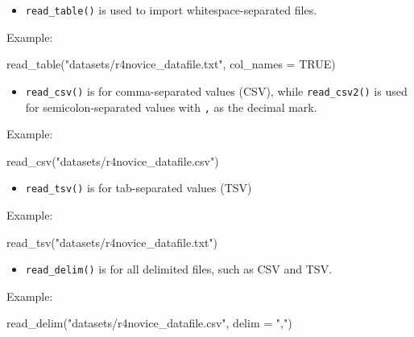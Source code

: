\documentclass[
  letterpaper,
  DIV=11,
  numbers=noendperiod]{scrreprt}
\newenvironment{Shaded}{}{}
\newcommand{\AttributeTok}[1]{\textcolor[rgb]{0.84,0.23,0.29}{#1}}
\newcommand{\ConstantTok}[1]{\textcolor[rgb]{0.00,0.36,0.77}{#1}}
\newcommand{\FunctionTok}[1]{\textcolor[rgb]{0.44,0.26,0.76}{#1}}
\newcommand{\NormalTok}[1]{\textcolor[rgb]{0.14,0.16,0.18}{#1}}
\newcommand{\StringTok}[1]{\textcolor[rgb]{0.01,0.18,0.38}{#1}}
\providecommand{\tightlist}{%
  \setlength{\itemsep}{0pt}\setlength{\parskip}{0pt}}\usepackage{longtable,booktabs,array}
\begin{document}
\begin{itemize}
\tightlist
\item
  \texttt{read\_table()} is used to import whitespace-separated files.
\end{itemize}

Example:

\begin{Shaded}
\begin{Highlighting}[]
\FunctionTok{read\_table}\NormalTok{(}\StringTok{"datasets/r4novice\_datafile.txt"}\NormalTok{, }\AttributeTok{col\_names =} \ConstantTok{TRUE}\NormalTok{)}
\end{Highlighting}
\end{Shaded}

\begin{itemize}
\tightlist
\item
  \texttt{read\_csv()} is for comma-separated values (CSV), while
  \texttt{read\_csv2()} is used for semicolon-separated values with
  \texttt{,} as the decimal mark.
\end{itemize}

Example:

\begin{Shaded}
\begin{Highlighting}[]
\FunctionTok{read\_csv}\NormalTok{(}\StringTok{"datasets/r4novice\_datafile.csv"}\NormalTok{)}
\end{Highlighting}
\end{Shaded}

\begin{itemize}
\tightlist
\item
  \texttt{read\_tsv()} is for tab-separated values (TSV)
\end{itemize}

Example:

\begin{Shaded}
\begin{Highlighting}[]
\FunctionTok{read\_tsv}\NormalTok{(}\StringTok{"datasets/r4novice\_datafile.txt"}\NormalTok{)}
\end{Highlighting}
\end{Shaded}

\begin{itemize}
\tightlist
\item
  \texttt{read\_delim()} is for all delimited files, such as CSV and
  TSV.
\end{itemize}

Example:

\begin{Shaded}
\begin{Highlighting}[]
\FunctionTok{read\_delim}\NormalTok{(}\StringTok{"datasets/r4novice\_datafile.csv"}\NormalTok{, }\AttributeTok{delim =} \StringTok{","}\NormalTok{)}
\end{Highlighting}
\end{Shaded}
\end{document}
